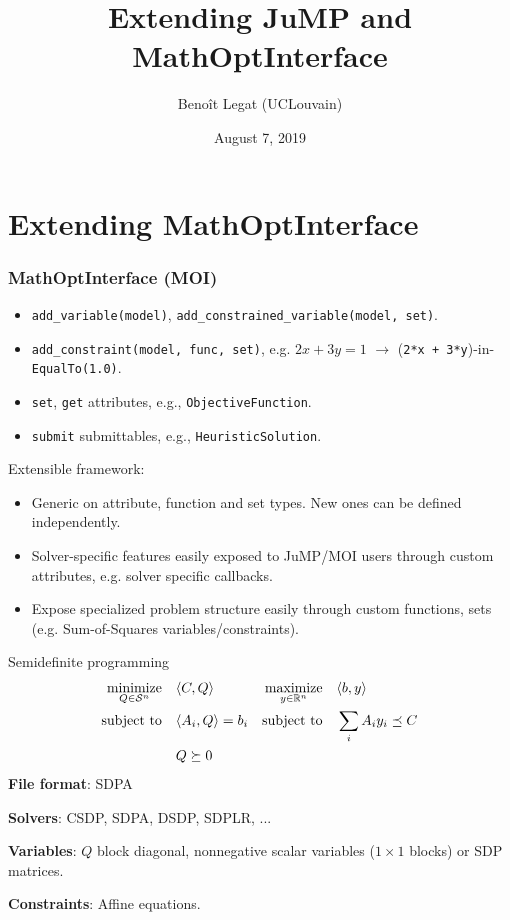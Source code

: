 \documentclass{beamer}
\title{Extending JuMP and MathOptInterface}
\date{August 7, 2019}
\author{Beno\^it Legat (UCLouvain)}
\begin{document}
  \maketitle

  \begin{frame}
    \tableofcontents
  \end{frame}

\section{Extending MathOptInterface}

  \begin{frame}[fragile]
    \frametitle{MathOptInterface (MOI)}
    \begin{itemize}
      \item \verb|add_variable(model)|, \verb|add_constrained_variable(model, set)|.
      \item \verb|add_constraint(model, func, set)|, e.g. $2x + 3y = 1$ $\to$ (\verb|2*x + 3*y|)-in-\verb|EqualTo(1.0)|.
      \item \verb|set|, \verb|get| attributes, e.g., \verb|ObjectiveFunction|.
      \item \verb|submit| submittables, e.g., \verb|HeuristicSolution|.
    \end{itemize}
    Extensible framework:
    \begin{itemize}
      \item \alert{Generic} on attribute, function and set types. New ones can be defined \alert{independently}.
      \item Solver-\alert{specific} features easily exposed to JuMP/MOI users through \alert{custom} attributes, e.g. solver specific callbacks.
      \item Expose \alert{specialized} problem structure easily through \alert{custom} functions, sets (e.g. Sum-of-Squares variables/constraints).
    \end{itemize}
  \end{frame}

  \begin{frame}{Semidefinite programming}
    \begin{align*}
      \operatorname*{minimize}_{Q \in \mathcal{S}^{n}} \quad & \langle C, Q \rangle & \operatorname*{maximize}_{y \in \mathbb{R}^n} \quad & \langle b, y \rangle\\
      \operatorname*{\operatorname*{\text{subject to}}\quad} & \langle A_i, Q \rangle = b_i & \operatorname*{\operatorname*{\text{subject to}}\quad} & \sum_i A_i y_i \preceq C\\
        & Q \succeq 0
    \end{align*}
    \textbf{File format}: SDPA

    \textbf{Solvers}: CSDP, SDPA, DSDP, SDPLR, ...

    \textbf{Variables}: $Q$ block diagonal, nonnegative scalar variables ($1 \times 1$ blocks) or SDP matrices.

    \textbf{Constraints}: Affine equations.
  \end{frame}
\end{document}
